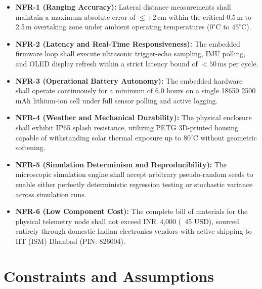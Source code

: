 \begin{itemize}
    \item \textbf{NFR-1 (Ranging Accuracy):} Lateral distance measurements shall maintain a maximum absolute error of $\le \pm 2\,\text{cm}$ within the critical 0.5\,m to 2.5\,m overtaking zone under ambient operating temperatures ($0^\circ\text{C}$ to $45^\circ\text{C}$).
    \item \textbf{NFR-2 (Latency and Real-Time Responsiveness):} The embedded firmware loop shall execute ultrasonic trigger-echo sampling, IMU polling, and OLED display refresh within a strict latency bound of $< 50\,\text{ms}$ per cycle.
    \item \textbf{NFR-3 (Operational Battery Autonomy):} The embedded hardware shall operate continuously for a minimum of 6.0 hours on a single 18650 2500\,mAh lithium-ion cell under full sensor polling and active logging.
    \item \textbf{NFR-4 (Weather and Mechanical Durability):} The physical enclosure shall exhibit IP65 splash resistance, utilizing PETG 3D-printed housing capable of withstanding solar thermal exposure up to $80^\circ\text{C}$ without geometric softening.
    \item \textbf{NFR-5 (Simulation Determinism and Reproducibility):} The microscopic simulation engine shall accept arbitrary pseudo-random seeds to enable either perfectly deterministic regression testing or stochastic variance across simulation runs.
    \item \textbf{NFR-6 (Low Component Cost):} The complete bill of materials for the physical telemetry node shall not exceed INR~4,000 (~45 USD), sourced entirely through domestic Indian electronics vendors with active shipping to IIT (ISM) Dhanbad (PIN: 826004).
\end{itemize}

\section{Constraints and Assumptions}
